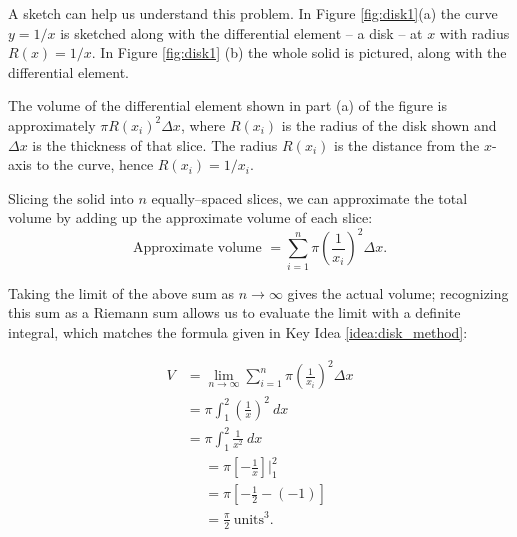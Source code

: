 {A sketch can help us understand this problem. In Figure \ref{fig:disk1}(a) the curve $y=1/x$ is sketched along with the differential element -- a disk -- at $x$ with radius $R(x)=1/x$. In Figure \ref{fig:disk1} (b) the whole solid is pictured, along with the differential element. 

The volume of the differential element shown in part (a) of the figure is approximately $\pi R(x_i)^2\Delta x$, where $R(x_i)$ is the radius of the disk shown and $\Delta x$ is the thickness of that slice. The radius $R(x_i)$ is the distance from the $x$-axis to the curve, hence $R(x_i) = 1/x_i$.

Slicing the solid into $n$ equally--spaced slices, we can approximate the total volume by adding up the approximate volume of each slice:
$$\text{Approximate volume } = \sum_{i=1}^n \pi \left(\frac1{x_i}\right)^2\Delta x.$$

Taking the limit of the above sum as $n\to\infty$ gives the actual volume; recognizing this sum as a Riemann sum allows us to evaluate the limit with a definite integral, which matches the formula given in Key Idea \ref{idea:disk_method}:

\begin{align*}
	V &= \lim_{n\to\infty}\sum_{i=1}^n \pi \left(\frac1{x_i}\right)^2\Delta x\\
		&= \pi\int_1^2 \left(\frac1x\right)^2\ dx \\
		&= \pi\int_1^2 \frac1{x^2}\ dx
		\end{align*}
\begin{align*}
		&= \pi\left[-\frac1x\right]\Big|_1^2 \\
		&= \pi \left[-\frac12 - \left(-1\right)\right] \\
		&= \frac{\pi}{2}\ \text{units}^3.
\end{align*}

}
